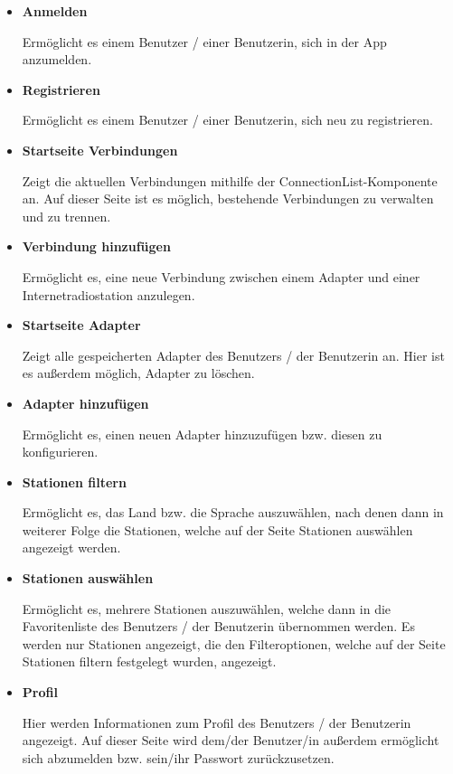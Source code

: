 \documentclass[11pt, twoside]{article}
\begin{document}
\begin{itemize}
	\item \textbf{Anmelden} 
	\par Ermöglicht es einem Benutzer / einer Benutzerin, sich in der App anzumelden.
	\item \textbf{Registrieren} 
	\par Ermöglicht es einem Benutzer / einer Benutzerin, sich neu zu registrieren.
	\item \textbf{Startseite Verbindungen} 
	\par Zeigt die aktuellen Verbindungen mithilfe der ConnectionList-Komponente an. Auf dieser Seite ist es möglich, bestehende Verbindungen zu verwalten und zu trennen.
	\item \textbf{Verbindung hinzufügen}
	\par Ermöglicht es, eine neue Verbindung zwischen einem Adapter und einer Internetradiostation anzulegen.
	\item \textbf{Startseite Adapter}
	\par Zeigt alle gespeicherten Adapter des Benutzers / der Benutzerin an. Hier ist es außerdem möglich, Adapter zu löschen.
	\item \textbf{Adapter hinzufügen}
	\par Ermöglicht es, einen neuen Adapter hinzuzufügen bzw. diesen zu konfigurieren.
	\item \textbf{Stationen filtern}
	\par Ermöglicht es, das Land bzw. die Sprache auszuwählen, nach denen dann in weiterer Folge die Stationen, welche auf der Seite \glqq Stationen auswählen\grqq{} angezeigt werden.
	\item \textbf{Stationen auswählen}
	\par Ermöglicht es, mehrere Stationen auszuwählen, welche dann in die Favoritenliste des Benutzers / der Benutzerin übernommen werden. Es werden nur Stationen angezeigt, die den Filteroptionen, welche auf der Seite \glqq Stationen filtern\grqq{} festgelegt wurden, angezeigt.
	\item \textbf{Profil}
	\par Hier werden Informationen zum Profil des Benutzers / der Benutzerin angezeigt. Auf dieser Seite wird dem/der Benutzer/in außerdem ermöglicht sich abzumelden bzw. sein/ihr Passwort zurückzusetzen.
\end{itemize}
\end{document}
